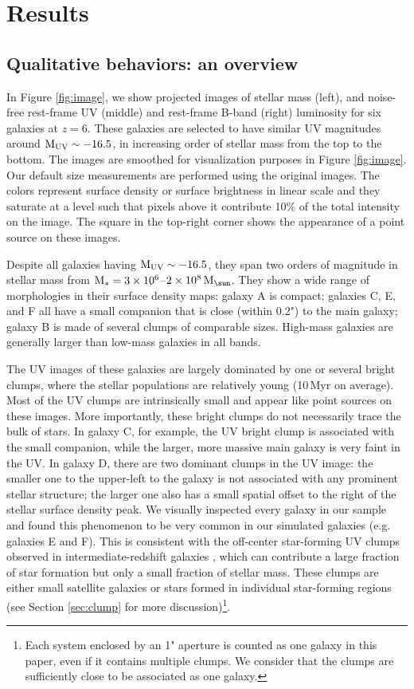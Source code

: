 \documentclass[useAMS,usenatbib]{mn2e}
\newcommand{\Ms}{{\rm M}_{\ast}}
\newcommand{\muv}{{\rm M_{UV}}}
\newcommand{\Msun}{{\rm M}_{\sun}}
\newcommand{\referee}[1]{{\color{black}#1}}
\begin{document}
\section{Results}
\label{sec:results}

\subsection{Qualitative behaviors: an overview}
\label{sec:overview}
In Figure \ref{fig:image}, we show projected images of stellar mass (left), and noise-free rest-frame UV (middle) and rest-frame B-band (right) luminosity for six galaxies at $z=6$. These galaxies are selected to have similar UV magnitudes around $\muv\sim-16.5$, in increasing order of stellar mass from the top to the bottom. The images are smoothed for visualization purposes in Figure \ref{fig:image}. Our default size measurements are performed using the original images. The colors represent surface density or surface brightness in linear scale and they saturate at a level such that pixels above it contribute 10\% of the total intensity on the image. The square in the top-right corner shows the appearance of a point source on these images.

Despite all galaxies having $\muv\sim-16.5$, they span two orders of magnitude in stellar mass from $\Ms=3\times10^6$--$2\times10^8\,\Msun$. They show a wide range of morphologies in their surface density maps: galaxy A is compact; galaxies C, E, and F all have a small companion that is close (within 0.2") to the main galaxy; galaxy B is made of several clumps of comparable sizes. High-mass galaxies are generally larger than low-mass galaxies in all bands.

The UV images of these galaxies are largely dominated by one or several bright clumps, where the stellar populations are relatively young (10\,Myr on average). Most of the UV clumps are intrinsically small and appear like point sources on these images. More importantly, these bright clumps do not necessarily trace the bulk of stars. In galaxy C, for example, the UV bright clump is associated with the small companion, while the larger, more massive main galaxy is very faint in the UV. In galaxy D, there are two dominant clumps in the UV image: the smaller one to the upper-left to the galaxy is not associated with any prominent stellar structure; the larger one also has a small spatial offset to the right of the stellar surface density peak. We visually inspected every galaxy in our sample and found this phenomenon to be very common in our simulated galaxies (e.g. galaxies E and F). This is consistent with the off-center star-forming UV clumps observed in intermediate-redshift galaxies \citep[$z\sim0.5$--2.5, e.g.][]{wuyts.2012:candels.clumps}, which can contribute a large fraction of star formation but only a small fraction of stellar mass. These clumps are either small satellite galaxies or stars formed in individual star-forming regions (see Section \ref{sec:clump} for more discussion)\footnote{\referee{Each system enclosed by an 1" aperture is counted as one galaxy in this paper, even if it contains multiple clumps. We consider that the clumps are sufficiently close to be associated as one galaxy.}}.
\end{document}
